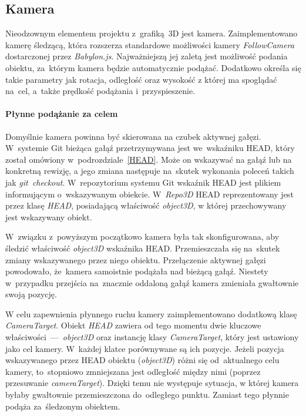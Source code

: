 \documentclass[12pt,a4paper,polish,thesis]{dcsbook}
\begin{document}
{	\subsection{Kamera} \label{camera}

	Nieodzownym elementem projektu z~grafiką~3D jest kamera. Zaimplementowano kamerę śledzącą, która rozszerza standardowe możliwości kamery \textit{FollowCamera} dostarczonej przez \textit{Babylon.js}. Najważniejszą jej zaletą jest możliwość podania obiektu, za~którym kamera będzie automatycznie podążać. Dodatkowo określa się takie parametry jak rotacja, odległość oraz wysokość z której ma spoglądać na~cel, a~także prędkość podążania i~przyspieszenie.

	\paragraph{Płynne podążanie za celem}

	Domyślnie kamera powinna być skierowana na czubek aktywnej gałęzi. W~systemie Git bieżąca gałąź przetrzymywana jest we~wskaźniku HEAD, który został omówiony w~podrozdziale~\ref{HEAD}. Może on wskazywać na gałąź lub na konkretną rewizję, a jego zmiana następuje na~skutek wykonania poleceń takich jak \textit{git~checkout}. W~repozytorium systemu Git wskaźnik HEAD jest plikiem informującym o~wskazywanym obiekcie. W~\textit{Repo3D} HEAD reprezentowany jest przez klasę \textit{HEAD}, posiadającą właściwość \textit{object3D}, w której przechowywany jest wskazywany obiekt.

	W~związku z~powyższym początkowo kamera była tak skonfigurowana, aby śledzić właściwość \textit{object3D} wskaźnika HEAD. Przemieszczała się na~skutek zmiany wskazywanego przez niego obiektu. Przełączenie aktywnej gałęzi powodowało, że~kamera samoistnie podążała nad bieżącą gałąź. Niestety w~przypadku przejścia na~znacznie oddaloną gałąź kamera zmieniała gwałtownie swoją pozycję.

	W celu zapewnienia płynnego ruchu kamery zaimplementowano dodatkową klasę \textit{CameraTarget}. Obiekt \textit{HEAD} zawiera od tego momentu dwie kluczowe właściwości~---~\textit{object3D} oraz instancję klasy \textit{CameraTarget}, który jest ustawiony jako cel kamery. W~każdej klatce porównywane są ich pozycje. Jeżeli pozycja wskazywanego przez HEAD obiektu (\textit{object3D}) różni się od~aktualnego celu kamery, to~stopniowo zmniejszana jest odległość między nimi (poprzez przesuwanie \textit{cameraTarget}). Dzięki temu nie występuje sytuacja, w której kamera byłaby gwałtownie przemieszczona do~odległego punktu. Zamiast tego płynnie podąża za~śledzonym obiektem.

}
\end{document}
